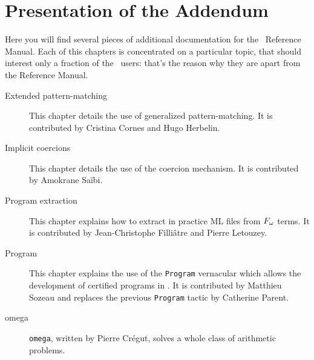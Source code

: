 \chapter*{Presentation of the Addendum}

Here you will find several pieces of additional documentation for the
\Coq\ Reference Manual. Each of this chapters is concentrated on a
particular topic, that should interest only a fraction of the \Coq\
users: that's the reason why they are apart from the Reference
Manual.

\begin{description}

\item[Extended pattern-matching] This chapter details the use of
  generalized pattern-matching. It is contributed by Cristina Cornes
  and Hugo Herbelin.

\item[Implicit coercions] This chapter details the use of the coercion
  mechanism.  It is contributed by Amokrane Saïbi.


\item[Program extraction] This chapter explains how to extract in practice ML
  files from $F_{\omega}$ terms.   It is contributed by Jean-Christophe
  Filliâtre and Pierre Letouzey.

\item[Program] This chapter explains the use of the \texttt{Program}
  vernacular which allows the development of certified
  programs in \Coq. It is contributed by Matthieu Sozeau and replaces
  the previous \texttt{Program} tactic by Catherine Parent.


\item[omega] \texttt{omega}, written by Pierre Crégut, solves a whole
  class of arithmetic problems.


\end{description}
